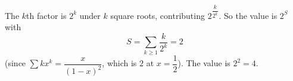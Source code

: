 The $k$th factor is $2^k$ under $k$ square roots, contributing $2^{\dfrac{k}{2^k}}$. So the value is $2^{S}$ with
\[
S=\sum_{k\ge1}\dfrac{k}{2^k}=2
\]
(since $\sum kx^k=\dfrac{x}{(1-x)^2}$, which is $2$ at $x=\dfrac{1}{2}$). The value is $2^2=\boxed{4}$.
